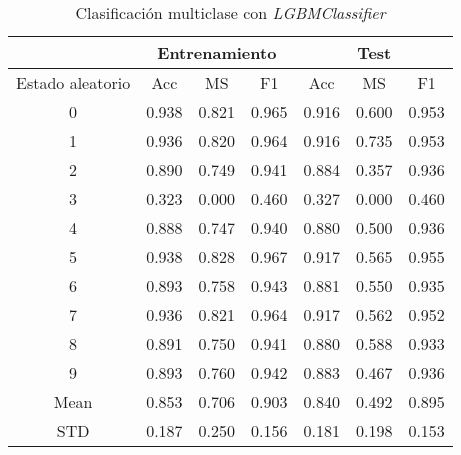 \begin{table}[th]
	\centering
	\begin{tabular}{ |c|c|c|c|c|c|c| }
		\hline
		\rowcolor{LightCyan}
		 & \multicolumn{3}{c|}{Entrenamiento} & \multicolumn{3}{c|}{Test} \\
		\hline
		\rowcolor{LightCyan}
		 Estado aleatorio & Acc & MS & F1 & Acc & MS & F1 \\
		\hline
		0 & 0.938 & 0.821 & 0.965 & 0.916 & 0.600 & 0.953 \\
		1 & 0.936 & 0.820 & 0.964 & 0.916 & 0.735 & 0.953 \\
		2 & 0.890 & 0.749 & 0.941 & 0.884 & 0.357 & 0.936 \\
		3 & 0.323 & 0.000 & 0.460 & 0.327 & 0.000 & 0.460 \\
		4 & 0.888 & 0.747 & 0.940 & 0.880 & 0.500 & 0.936 \\
		5 & 0.938 & 0.828 & 0.967 & 0.917 & 0.565 & 0.955 \\
		6 & 0.893 & 0.758 & 0.943 & 0.881 & 0.550 & 0.935 \\
		7 & 0.936 & 0.821 & 0.964 & 0.917 & 0.562 & 0.952 \\
		8 & 0.891 & 0.750 & 0.941 & 0.880 & 0.588 & 0.933 \\
		9 & 0.893 & 0.760 & 0.942 & 0.883 & 0.467 & 0.936 \\
		Mean & 0.853 & 0.706 & 0.903 & 0.840 & 0.492 & 0.895 \\
		STD & 0.187 & 0.250 & 0.156 & 0.181 & 0.198 & 0.153 \\
		\hline
	\end{tabular}
	\caption{Clasificación multiclase con \textit{LGBMClassifier}}
	\label{tabla:lgbm_multi}
\end{table}
